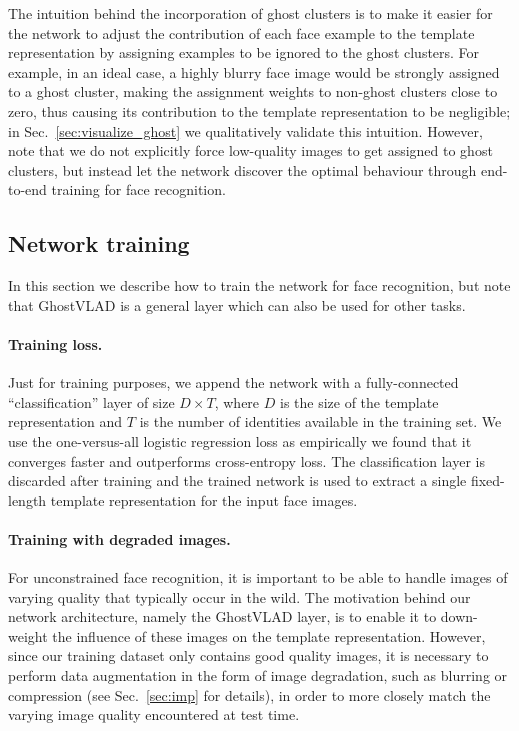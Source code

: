 \documentclass[runningheads]{llncs}
\begin{document}
The intuition behind the incorporation of ghost clusters is to
make it easier for the network to adjust
the contribution of each face example to the template representation
by assigning examples to be ignored to the ghost clusters.
For example, in an ideal case, a highly blurry face image
would be strongly assigned to a ghost cluster,
making the assignment weights to non-ghost clusters close to zero,
thus causing its contribution to the template representation
to be negligible;
in Sec.~\ref{sec:visualize_ghost} we qualitatively
validate this intuition.
However, note that we do not explicitly force low-quality images to
get assigned to ghost clusters, but instead let the network discover
the optimal behaviour through end-to-end training for face recognition.







\subsection{Network training}
\label{sec:train}
In this section we describe how to train the network for
face recognition, but note that GhostVLAD is a general layer which can
also be used for other tasks.

\paragraph{Training loss.}
Just for training purposes, we append the network with a fully-connected
``classification'' layer of size $D \times T$, where $D$ is the size
of the template representation and $T$ is the number of identities
available in the training set.
We use the one-versus-all logistic regression loss as empirically
we found that it converges faster and
outperforms cross-entropy loss.
The classification layer is discarded after training and the trained network
is used to extract a single fixed-length template representation
for the input face images.


%
%
%
%
%


\paragraph{Training with degraded images.}
For unconstrained face recognition, it is important to be able to handle
images of varying quality that typically occur in the wild.
The motivation behind our network architecture, namely the GhostVLAD layer,
is to enable it to down-weight the influence
of these images on the template representation.
However, since our training dataset only contains good quality images,
it is necessary to perform data augmentation in the form of image degradation,
such as blurring or compression (see Sec.~\ref{sec:imp} for details),
in order to more closely match the varying image quality encountered
at test time.
\end{document}
